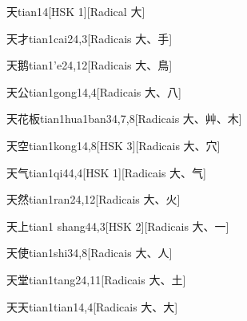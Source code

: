 \begin{entry}{天}{tian1}{4}[HSK 1][Radical ⼤]
\end{entry}

\begin{entry}{天才}{tian1cai2}{4,3}[Radicais ⼤、⼿]
\end{entry}

\begin{entry}{天鹅}{tian1'e2}{4,12}[Radicais ⼤、⿃]
\end{entry}

\begin{entry}{天公}{tian1gong1}{4,4}[Radicais ⼤、⼋]
\end{entry}

\begin{entry}{天花板}{tian1hua1ban3}{4,7,8}[Radicais ⼤、⾋、⽊]
\end{entry}

\begin{entry}{天空}{tian1kong1}{4,8}[HSK 3][Radicais ⼤、⽳]
\end{entry}

\begin{entry}{天气}{tian1qi4}{4,4}[HSK 1][Radicais ⼤、⽓]
\end{entry}

\begin{entry}{天然}{tian1ran2}{4,12}[Radicais ⼤、⽕]
\end{entry}

\begin{entry}{天上}{tian1 shang4}{4,3}[HSK 2][Radicais ⼤、⼀]
\end{entry}

\begin{entry}{天使}{tian1shi3}{4,8}[Radicais ⼤、⼈]
\end{entry}

\begin{entry}{天堂}{tian1tang2}{4,11}[Radicais ⼤、⼟]
\end{entry}

\begin{entry}{天天}{tian1tian1}{4,4}[Radicais ⼤、⼤]
\end{entry}

